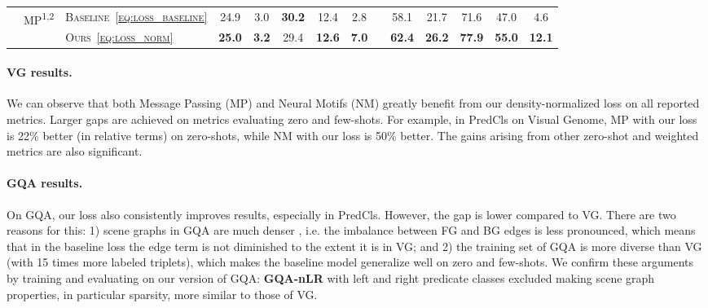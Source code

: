\begin{table}[t]
\begin{center}
\begin{tabular}{p{0.7cm}|llcccccp{0.1cm}ccccc}
			\hline
			& \multirow{2}{*}{MP\textsuperscript{1,2}} & \textsc{Baseline~\eqref{eq:loss_baseline}} & 24.9 & 3.0 & \textbf{30.2} & 12.4 & \cellcolor{extreme}2.8 & & 58.1 & \cellcolor{bad}21.7 & 71.6 & \cellcolor{bad}47.0 & \cellcolor{extreme}4.6 \Tstrut\\
			& & \textsc{Ours~\eqref{eq:loss_norm}} & \textbf{25.0} & \textbf{3.2} & 29.4 & \textbf{12.6} & \cellcolor{extreme}\textbf{7.0} & & \textbf{62.4} & \cellcolor{bad}\textbf{26.2} & \textbf{77.9} & \cellcolor{bad}\textbf{55.0} & \cellcolor{extreme}\textbf{12.1} \\
			\bottomrule
		\end{tabular}
	\end{center}
\end{table}

\vspace{-3pt}
\paragraph{VG results.} We can observe that both Message Passing (MP) and Neural Motifs (NM) greatly benefit from our density-normalized loss on all reported metrics. Larger gaps are achieved on metrics evaluating zero and few-shots. For example, in PredCls on Visual Genome, MP with our loss is 22\% better (in relative terms) on zero-shots, while NM with our loss is 50\% better. The gains arising from other zero-shot and weighted metrics are also significant.

\vspace{-3pt}
\paragraph{GQA results.} On GQA, our loss also consistently improves results, especially in PredCls. However, the gap is lower compared to VG. There are two reasons for this: 1) scene graphs in GQA are much denser
, 
i.e. the imbalance between FG and BG edges is less pronounced, which means that in the baseline loss the edge term is not diminished to the extent it is in VG; and 2) the training set of GQA is more diverse than VG (with 15 times more labeled triplets), which makes the baseline model generalize well on zero and few-shots. We confirm these arguments by training and evaluating on our version of GQA: \textbf{GQA-nLR} with left and right predicate classes excluded making scene graph properties, in particular sparsity, more similar to those of VG.


